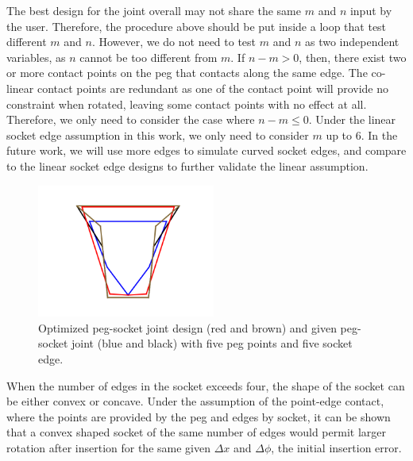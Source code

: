 \documentclass[letterpaper, 10 pt, conference]{ieeeconf}
\begin{document}
The best design for the joint overall may not share the same $m$ and $n$ input by the user. Therefore, the procedure above should be put inside a loop that test different $m$ and $n$. However, we do not need to test $m$ and $n$ as two independent variables, as $n$ cannot be too different from $m$. If $n - m > 0$, then, there exist two or more contact points on the peg that contacts along the same edge. The co-linear contact points are redundant as one of the contact point will provide no constraint when rotated, leaving some contact points with no effect at all. Therefore, we only need to consider the case where $n - m \le 0$. Under the linear socket edge assumption in this work, we only need to consider $m$ up to 6. In the future work, we will use more edges to simulate curved socket edges, and compare to the linear socket edge designs to further validate the linear assumption. 



\begin{figure}[t]
\begin{center}
\includegraphics[width=2.3in]{figures/best_5-5_joint.png}
\end{center}
\caption{Optimized peg-socket joint design (red and brown) and given peg-socket joint (blue and black) with five peg points and five socket edge. }
\label{fig:best_5_5_joint}
\end{figure}

When the number of edges in the socket exceeds four, the shape of the socket can be either convex or concave. Under the assumption of the point-edge contact, where the points are provided by the peg and edges by socket, it can be shown that a convex shaped socket of the same number of edges would permit larger rotation after insertion for the same given $\Delta x$ and $\Delta\phi$, the initial insertion error. 
\end{document}
